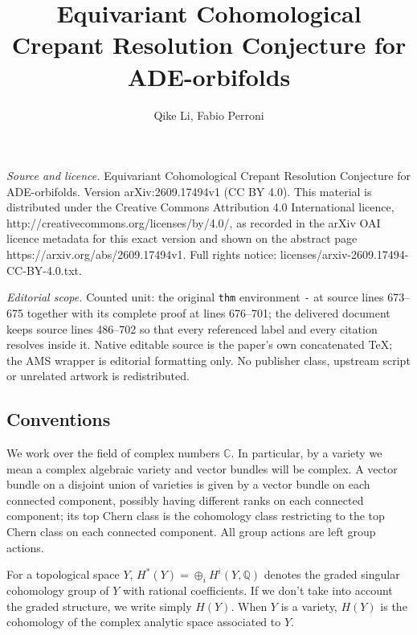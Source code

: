 \documentclass[10pt,a4paper]{amsart}
\newcommand{\Q}{\mathbb{Q}}
\newcommand{\C}{\mathbb{C}}
\newcommand{\1}{\mathds{1}}   %
\begin{document}
\title[Equivariant Cohomological Crepant Resolution Conjecture for ]{Equivariant Cohomological Crepant Resolution Conjecture for ADE-orbifolds}
\author{Qike Li, Fabio Perroni}
\date{}
\maketitle
\noindent\emph{Source and licence.} Equivariant Cohomological Crepant Resolution Conjecture for ADE-orbifolds. Version arXiv:2609.17494v1 (CC BY 4.0). This material is distributed under the Creative Commons Attribution 4.0 International licence, http://creativecommons.org/licenses/by/4.0/, as recorded in the arXiv OAI licence metadata for this exact version and shown on the abstract page https://arxiv.org/abs/2609.17494v1. Full rights notice: licenses/arxiv-2609.17494-CC-BY-4.0.txt.\par\smallskip
\noindent\textit{Editorial scope.} Counted unit: the original \texttt{thm} environment \texttt{-} at source lines 673--675 together with its complete proof at lines 676--701; the delivered document keeps source lines 486--702 so that every referenced label and every citation resolves inside it. Native editable source is the paper's own concatenated TeX; the AMS wrapper is editorial formatting only. No publisher class, upstream script or unrelated artwork is redistributed.
\subsection{Conventions}\label{conventions}
We work over the field of complex numbers $\C$.
In particular, by a variety we mean a complex algebraic variety and vector bundles will be complex. 
A vector bundle on a disjoint union 
of varieties is given by a vector bundle on each connected component, possibly having different ranks on each 
connected component; its top Chern class is the cohomology class restricting to the top Chern class on each 
connected component. 
All group actions are left group actions.

For a topological space $Y$, 
$H^*(Y)=\oplus_i H^i(Y, \Q)$ denotes the graded singular cohomology group of $Y$ with rational coefficients. 
If we don't take into account the graded structure, we write simply $H(Y)$. When $Y$ is a variety, $H(Y)$
is the cohomology of the complex analytic space associated to $Y$. 
\end{document}
